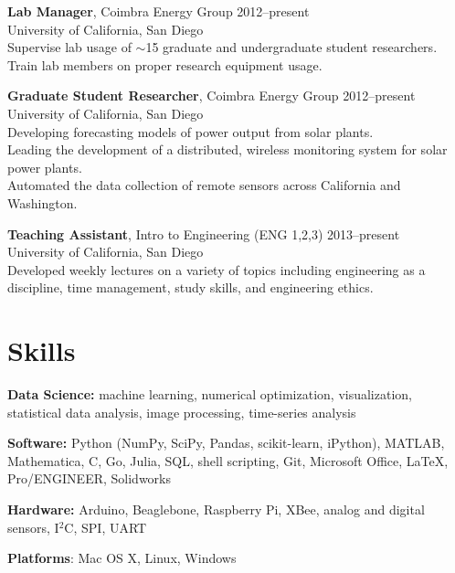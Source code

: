 \documentclass[]{res}
\begin{document}
\begin{resume}
\textbf{Lab Manager}, Coimbra Energy Group \hfill 2012--present \\
University of California, San Diego \\
Supervise lab usage of $\sim$15 graduate and undergraduate student researchers. \\
Train lab members on proper research equipment usage.

\textbf{Graduate Student Researcher}, Coimbra Energy Group \hfill 2012--present \\
University of California, San Diego \\
Developing forecasting models of power output from solar plants. \\
Leading the development of a distributed, wireless monitoring system for solar power plants. \\
Automated the data collection of remote sensors across California and Washington.

\textbf{Teaching Assistant}, Intro to Engineering (ENG 1,2,3) \hfill 2013--present \\
University of California, San Diego \\
Developed weekly lectures on a variety of topics including engineering as a
discipline, time management, study skills, and engineering ethics.



\section{Skills}
\vspace{0.1in}

\textbf{Data Science:} machine learning, numerical optimization, visualization,
statistical data analysis, image processing, time-series analysis

\textbf{Software:} Python (NumPy, SciPy, Pandas, scikit-learn, iPython),
MATLAB, Mathematica, C, Go, Julia, SQL, shell scripting, Git, Microsoft Office,
LaTeX, Pro/ENGINEER, Solidworks

\textbf{Hardware:} Arduino, Beaglebone, Raspberry Pi, XBee, analog and digital
sensors, I$^2$C, SPI, UART

\textbf{Platforms}: Mac OS X, Linux, Windows



\end{resume}
\end{document}

